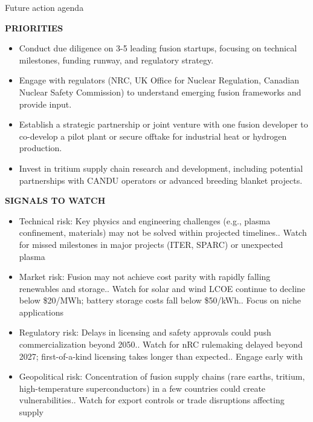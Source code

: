 \documentclass[10pt,a4paper]{article}
\begin{document}
\clearpage
{\sffamily\fontsize{21}{26}\selectfont\color{BONavy} Future action agenda}\par\vspace{7pt}
\begin{minipage}[t]{0.47\linewidth}
{\textcolor{BOGreen}{\scriptsize\bfseries PRIORITIES}}\par\vspace{3pt}
{\small\begin{itemize}
\item Conduct due diligence on 3-5 leading fusion startups, focusing on technical milestones, funding runway, and regulatory strategy.
\item Engage with regulators (NRC, UK Office for Nuclear Regulation, Canadian Nuclear Safety Commission) to understand emerging fusion frameworks and provide input.
\item Establish a strategic partnership or joint venture with one fusion developer to co-develop a pilot plant or secure offtake for industrial heat or hydrogen production.
\item Invest in tritium supply chain research and development, including potential partnerships with CANDU operators or advanced breeding blanket projects.
\end{itemize}}
\end{minipage}\hfill\begin{minipage}[t]{0.45\linewidth}
{\textcolor{BOGreen}{\scriptsize\bfseries SIGNALS TO WATCH}}\par\vspace{3pt}
{\small\begin{itemize}
\item Technical risk: Key physics and engineering challenges (e.g., plasma confinement, materials) may not be solved within projected timelines.. Watch for missed milestones in major projects (ITER, SPARC) or unexpected plasma
\item Market risk: Fusion may not achieve cost parity with rapidly falling renewables and storage.. Watch for solar and wind LCOE continue to decline below \$20/MWh; battery storage costs fall below \$50/kWh.. Focus on niche applications
\item Regulatory risk: Delays in licensing and safety approvals could push commercialization beyond 2050.. Watch for nRC rulemaking delayed beyond 2027; first-of-a-kind licensing takes longer than expected.. Engage early with
\item Geopolitical risk: Concentration of fusion supply chains (rare earths, tritium, high-temperature superconductors) in a few countries could create vulnerabilities.. Watch for export controls or trade disruptions affecting supply
\end{itemize}}
\end{minipage}
\end{document}
